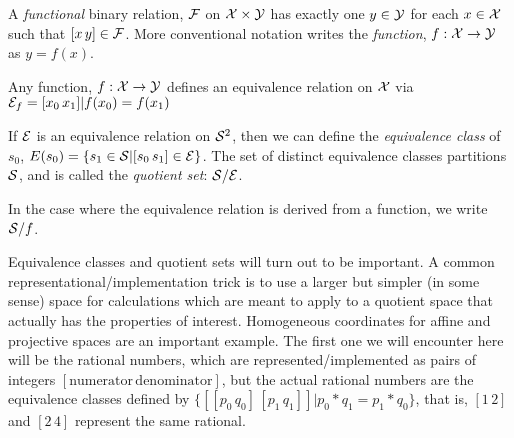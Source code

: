 
A \textit{functional} binary relation, $\mathcal{F}$ on $\mathcal{X}
\times \mathcal{Y}$ has exactly one $y \in \mathcal{Y}$ for each
$x \in \mathcal{X}$ such that $[x \, y] \in \mathcal{F}$.
More conventional notation writes the \textit{function}, 
$f : \mathcal{X} \rightarrow \mathcal{Y}$ as $y = f(x)$.

Any function, $f : \mathcal{X} \rightarrow \mathcal{Y}$ defines an
equivalence relation on $\mathcal{X}$ via 
$\mathcal{E}_f = {[x_0 \, x_1] | f(x_0) = f(x_1)}$


If $\mathcal{E}$ is an equivalence relation on $\mathcal{S}^2$, then we
can define the \textit{equivalence class} of $s_0$, $E(s_0) = \{
s_1 \in \mathcal{S} | [s_0 \, s_1] \in \mathcal{E} \}$.
The set of distinct equivalence classes partitions $\mathcal{S}$,
and is called the \textit{quotient set}: $\mathcal{S} / \mathcal{E}$.

In the case where the equivalence relation is derived from a
function, we write $\mathcal{S} / f$.

Equivalence classes and quotient sets will turn out to be
important. A common representational/implementation trick is to
use a larger but simpler (in some sense) space for calculations
which are meant to apply to a quotient space that actually has the
properties of interest. Homogeneous coordinates for affine and
projective spaces  are an important example.
The first one we will encounter here will be the rational numbers,
which are represented/implemented as pairs of integers
$[\text{numerator} \, \text{denominator}]$, but the actual
rational numbers are the equivalence classes defined by 
$\{ [[p_0 \, q_0] \, [p_1 \, q_1]] | p_0*q_1 = p_1*q_0 \}$,
that is, $[1 \, 2]$ and $[2 \, 4]$ represent the same rational.




